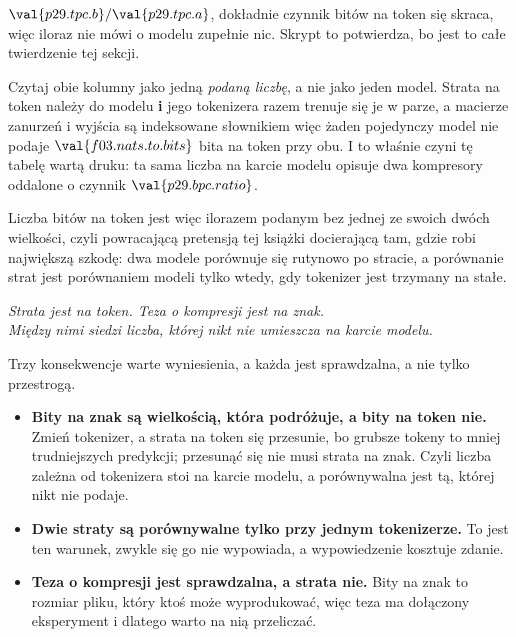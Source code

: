 \begin{fr}

$\val{p29.tpc.b} / \val{p29.tpc.a}$, dokładnie \dash{} czynnik bitów na token
się skraca, więc iloraz nie mówi o modelu zupełnie nic. Skrypt to potwierdza,
bo jest to całe twierdzenie tej sekcji.

\begin{note}
Czytaj obie kolumny jako jedną \emph{podaną liczbę}, a nie jako jeden model.
Strata na token należy do modelu \textbf{i} jego tokenizera razem \dash{}
trenuje się je w parze, a macierze zanurzeń i wyjścia są indeksowane
słownikiem \dash{} więc żaden pojedynczy model nie podaje
$\val{f03.nats.to.bits}$ bita na token przy obu. I to właśnie czyni tę tabelę
wartą druku: ta sama liczba na karcie modelu opisuje dwa kompresory oddalone o
czynnik $\val{p29.bpc.ratio}$.
\end{note}

Liczba bitów na token jest więc ilorazem podanym bez jednej ze swoich dwóch
wielkości, czyli powracającą pretensją tej książki docierającą tam, gdzie robi
największą szkodę: dwa modele porównuje się rutynowo po stracie, a porównanie
strat jest porównaniem modeli tylko wtedy, gdy tokenizer jest trzymany na
stałe.

\begin{center}
\emph{Strata jest na token. Teza o kompresji jest na znak.\\
Między nimi siedzi liczba, której nikt nie umieszcza na karcie modelu.}
\end{center}

Trzy konsekwencje warte wyniesienia, a każda jest sprawdzalna, a nie tylko
przestrogą.

\begin{itemize}
\item \textbf{Bity na znak są wielkością, która podróżuje, a bity na token
  nie.} Zmień tokenizer, a strata na token się przesunie, bo grubsze tokeny to
  mniej trudniejszych predykcji; przesunąć się nie musi strata na znak. Czyli
  liczba zależna od tokenizera stoi na karcie modelu, a porównywalna jest tą,
  której nikt nie podaje.
\item \textbf{Dwie straty są porównywalne tylko przy jednym tokenizerze.} To
  jest ten warunek, zwykle się go nie wypowiada, a wypowiedzenie kosztuje
  zdanie.
\item \textbf{Teza o kompresji jest sprawdzalna, a strata nie.} Bity na znak
  to rozmiar pliku, który ktoś może wyprodukować, więc teza ma dołączony
  eksperyment \dash{} i dlatego warto na nią przeliczać.
\end{itemize}

\end{fr}

